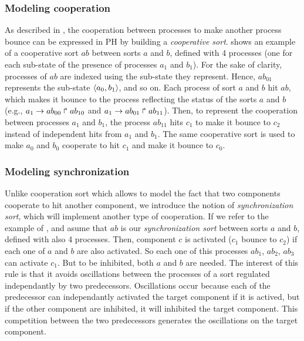 \subsubsection{Modeling cooperation}

As described in \cite{PMR10-TCSB}, the cooperation between processes to make another process bounce can be
expressed in PH by building a \emph{cooperative sort}.
 shows an example of a cooperative sort $ab$ between sorts $a$ and $b$,
defined with 4 processes (one for each sub-state of the presence of processes $a_1$ and $b_1$).
For the sake of clarity, processes of $ab$ are indexed using the sub-state they represent.
Hence, $ab_{01}$ represents the sub-state $\langle a_0,b_1 \rangle$, and so on.
Each process of sort $a$ and $b$ hit $ab$, which makes it bounce to the process reflecting the status of the sorts $a$
and $b$ (e.g., $a_1\rightarrow ab_{00}\Rsh ab_{10}$ and $a_1\rightarrow ab_{01}\Rsh ab_{11}$).
Then, to represent the cooperation between processes $a_1$ and $b_1$,
the process $ab_{11}$ hits $c_1$ to make it bounce to $c_2$ instead of
independent hits from $a_1$ and $b_1$.
The same cooperative sort is used to make $a_0$ and $b_0$ cooperate to hit $c_1$ and make it bounce to $c_0$.
\subsubsection{Modeling synchronization}
\label{sssec:synchronization}
Unlike cooperation sort which allows  to model the fact that two components cooperate to hit another component, we introduce
the notion of \emph{synchronization sort}, which will implement another type of cooperation. If we refer to the example of
, and asume that $ab$ is our \emph{synchronization sort} between sorts $a$ and $b$, defined with also 
4 processes. Then, component $c$ is activated ($c_1$ bounce to $c_2$) if each one of $a$ and $b$ are also activated. So each 
one of this processes $ab_1$, $ab_2$, $ab_3$ can activate $c_1$. But to be inhibited, both $a$ and $b$ are needed.
The interest of this rule is that it avoids oscillations between the processes of a sort regulated independantly by 
two predecessors. Oscillations occur because each of the predecessor can independantly activated the target component if it is actived,
but if the other component are inhibited, it will inhibited the target component. This competition between the two predecessors
generates the oscillations on the target component.  


